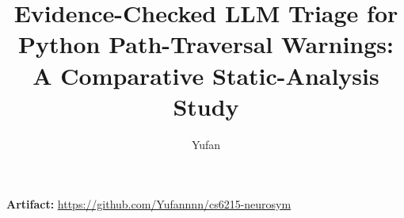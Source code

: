 \documentclass[sigconf]{acmart}
\begin{document}
\sloppy

\title{Evidence-Checked LLM Triage for Python Path-Traversal Warnings: A Comparative Static-Analysis Study}

\author{Yufan}

\begin{abstract}

\end{abstract}

\maketitle

\noindent\textbf{Artifact:} \url{https://github.com/Yufannnn/cs6215-neurosym}











\end{document}
